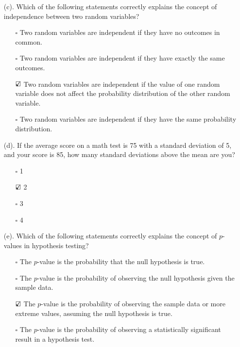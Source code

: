 \documentclass{./../../Latex/tests}
\begin{document}
\begin{enumerate}
\item[(c).] Which of the following statements correctly explains the concept of independence between two random variables?
\begin{enumerate}
\item[$\square$] Two random variables are independent if they have no outcomes in common.
\item[$\square$] Two random variables are independent if they have exactly the same outcomes.
\item[$\text{\rlap{$\checkmark$}}\square$] Two random variables are independent if the value of one random variable does not affect the probability distribution of the other random variable.
\item[$\square$] Two random variables are independent if they have the same probability distribution. \\
\end{enumerate}

\item[(d).] If the average score on a math test is 75 with a standard deviation of 5, and your score is 85, how many standard deviations above the mean are you?
\begin{enumerate}
\item[$\square$] 1
\item[$\text{\rlap{$\checkmark$}}\square$] 2
\item[$\square$] 3
\item[$\square$] 4 \\
\end{enumerate}

\item[(e).] Which of the following statements correctly explains the concept of $p$-values in hypothesis testing?
\begin{enumerate}
\item[$\square$] The $p$-value is the probability that the null hypothesis is true.
\item[$\square$] The $p$-value is the probability of observing the null hypothesis given the sample data.
\item[$\text{\rlap{$\checkmark$}}\square$] The $p$-value is the probability of observing the sample data or more extreme values, assuming the null hypothesis is true.
\item[$\square$] The $p$-value is the probability of observing a statistically significant result in a hypothesis test.
\end{enumerate}
\end{enumerate}
\end{document}
